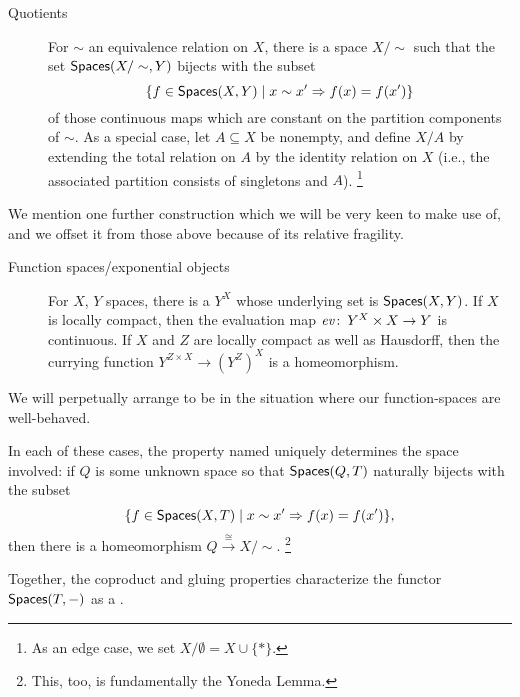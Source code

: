 \begin{description}
    \item[Quotients]
    For $\sim$ an equivalence relation on $X$, there is a space $X / \sim$ such that the set $\mathsf{Spaces}(X / \sim, Y)$ bijects with the subset \[\{f \in \mathsf{Spaces}(X, Y) \mid x \sim x' \Rightarrow f(x) = f(x')\}\] of those continuous maps which are constant on the partition components of $\sim$.
    As a special case, let $A \subseteq X$ be nonempty, and define $X/A$ by extending the total relation on $A$ by the identity relation on $X$ (i.e., the associated partition consists of singletons and $A$).
    \footnote{As an edge case, we set $X / \emptyset = X \cup \{*\}$.}
\end{description}

We mention one further construction which we will be very keen to make use of, and we offset it from those above because of its relative fragility.

\begin{description}
    \item[Function spaces/exponential objects]
    For $X$, $Y$ spaces, there is a  $Y^X$ whose underlying set is $\mathsf{Spaces}(X, Y)$.
    If $X$ is locally compact, then the evaluation map $\mathit{ev}\colon\thinspace Y^X \times X \to Y$ is continuous.
    If $X$ and $Z$ are locally compact as well as Hausdorff, then the currying function $Y^{Z \times X} \to (Y^Z)^X$ is a homeomorphism.
\end{description}

\noindent
We will perpetually arrange to be in the situation where our function-spaces are well-behaved.

\begin{remark}
In each of these cases, the property named uniquely determines the space involved: if $Q$ is some unknown space so that $\mathsf{Spaces}(Q, T)$ naturally bijects with the subset \[\{f \in \mathsf{Spaces}(X, T) \mid x \sim x' \Rightarrow f(x) = f(x') \},\] then there is a homeomorphism $Q \xrightarrow\cong X/\sim$.
\footnote{This, too, is fundamentally the Yoneda Lemma.}
\end{remark}

\begin{remark}\label{HomSheafRemark}
Together, the coproduct and gluing properties characterize the functor $\mathsf{Spaces}(T, -)$ as a .
\end{remark}

